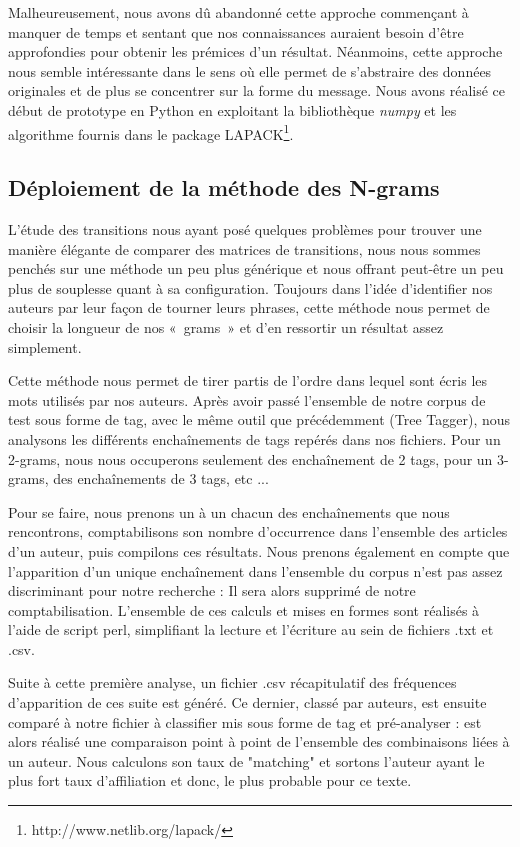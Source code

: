 \documentclass[a4paper,12pt]{report}
\begin{document}
Malheureusement, nous avons dû abandonné cette approche commençant à manquer de temps et sentant que nos connaissances auraient besoin d'être approfondies pour obtenir les prémices d'un résultat. Néanmoins, cette approche nous semble intéressante dans le sens où elle permet de s'abstraire des données originales et de plus se concentrer sur la forme du message. Nous avons réalisé ce début de prototype en Python en exploitant la bibliothèque \textit{numpy} et les algorithme fournis dans le package LAPACK\footnote{http://www.netlib.org/lapack/}.

\subsection{Déploiement de la méthode des N-grams}

L'étude des transitions nous ayant posé quelques problèmes pour trouver une manière élégante de comparer des matrices de transitions, nous nous sommes penchés sur une méthode un peu plus générique et nous offrant peut-être un peu plus de souplesse quant à sa configuration. Toujours dans l'idée d'identifier nos auteurs par leur façon de tourner leurs phrases, cette méthode nous permet de choisir la longueur de nos «~grams~» et d'en ressortir un résultat assez simplement.

Cette méthode nous permet de tirer partis de l'ordre dans lequel sont écris les mots utilisés par nos auteurs. Après avoir passé l'ensemble de notre corpus de test sous forme de tag, avec le même outil que précédemment (Tree Tagger), nous analysons les différents enchaînements de tags repérés dans nos fichiers. Pour un 2-grams, nous nous occuperons seulement des enchaînement de 2 tags, pour un 3-grams, des enchaînements de 3 tags, etc ...

Pour se faire, nous prenons un à un chacun des enchaînements que nous rencontrons, comptabilisons son nombre d'occurrence dans l'ensemble des articles d'un auteur, puis compilons ces résultats. Nous prenons également en compte que l'apparition d'un unique enchaînement dans l'ensemble du corpus n'est pas assez discriminant pour notre recherche : Il sera alors supprimé de notre comptabilisation. L'ensemble de ces calculs et mises en formes sont réalisés à l'aide de script perl, simplifiant la lecture et l'écriture au sein de fichiers .txt et .csv.

Suite à cette première analyse, un fichier .csv récapitulatif des fréquences d'apparition de ces suite est généré. Ce dernier, classé par auteurs, est ensuite comparé à notre fichier à classifier mis sous forme de tag et pré-analyser : est alors réalisé une comparaison point à point de l'ensemble des combinaisons liées à un auteur. Nous calculons son taux de "matching" et sortons l'auteur ayant le plus fort taux d'affiliation et donc, le plus probable pour ce texte. 
\end{document}
